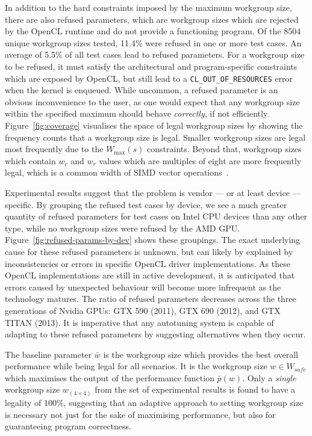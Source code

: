 \documentclass[nonatbib,preprint,10pt]{sigplanconf}
\begin{document}
In addition to the hard constraints imposed by the maximum workgroup
size, there are also refused parameters, which are workgroup sizes
which are rejected by the OpenCL runtime and do not provide a
functioning program. Of the 8504 unique workgroup sizes tested, 11.4\%
were refused in one or more test cases. An average of 5.5\% of all
test cases lead to refused parameters. For a workgroup size to be
refused, it must satisfy the architectural and program-specific
constraints which are exposed by OpenCL, but still lead to a
\texttt{CL\_OUT\_OF\_RESOURCES} error when the kernel is enqueued.
While uncommon, a refused parameter is an obvious inconvenience to the
user, as one would expect that any workgroup size within the specified
maximum should behave \emph{correctly}, if not
efficiently. Figure~\ref{fig:coverage} visualises the space of legal
workgroup sizes by showing the frequency counts that a workgroup size
is legal. Smaller workgroup sizes are legal most frequently due to the
$W_{\max}(s)$ constraints. Beyond that, workgroup sizes which contain
$w_c$ and $w_r$ values which are multiples of eight are more
frequently legal, which is a common width of SIMD vector
operations~\cite{IntelCorporation2012}.

Experimental results suggest that the problem is vendor --- or at
least device --- specific. By grouping the refused test cases by
device, we see a much greater quantity of refused parameters for test
cases on Intel CPU devices than any other type, while no workgroup
sizes were refused by the AMD
GPU. Figure~\ref{fig:refused-params-by-dev} shows these groupings. The
exact underlying cause for these refused parameters is unknown, but
can likely by explained by inconsistencies or errors in specific
OpenCL driver implementations. As these OpenCL implementations are
still in active development, it is anticipated that errors caused by
unexpected behaviour will become more infrequent as the technology
matures. The ratio of refused parameters decreases across the three
generations of Nvidia GPUs: GTX 590 (2011), GTX 690 (2012), and GTX
TITAN (2013). It is imperative that any autotuning system is capable
of adapting to these refused parameters by suggesting alternatives
when they occur.


The baseline parameter $\bar{w}$ is the workgroup size which provides
the best overall performance while being legal for all scenarios. It
is the workgroup size $w \in W_{safe}$ which maximises the output of
the performance function $\bar{p}(w)$.
Only a \emph{single} workgroup size $w_{(4 \times 4)}$ from the set of
experimental results is found to have a legality of 100\%, suggesting
that an adaptive approach to setting workgroup size is necessary not
just for the sake of maximising performance, but also for guaranteeing
program correctness.
\end{document}
